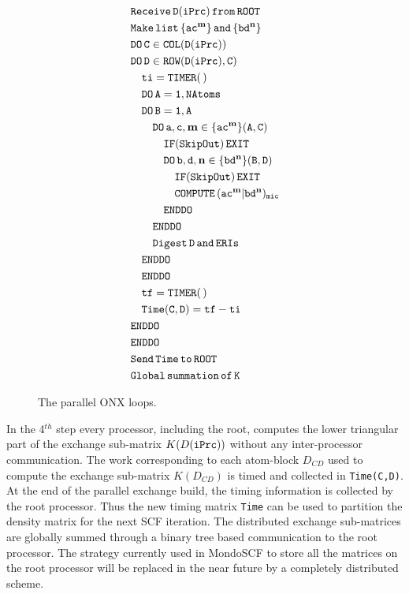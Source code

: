 \documentclass[prl,twocolumn,twocolumngrid,superbib]{revtex4}
\begin{document}
\begin{figure}[htbp]
  \centering
  \caption{\protect
    The parallel ONX loops. 
  }\label{Fig:ONXcore}
  \begin{equation*}
    \begin{split}
      &\tt        Receive\,D(iPrc)\,from\,ROOT\\
      &\tt        Make\,list\,\{ac^\mathbf{m}\}\,and\,\{bd^\mathbf{n}\} \\
      &\tt        DO\,C\in COL(D(iPrc)) \\
      &\tt        DO\,D\in ROW(D(iPrc),C) \\
      &\tt\quad     ti=TIMER(\,) \\
      &\tt\quad     DO\,A=1,NAtoms \\
      &\tt\quad     DO\,B=1,A \\
      &\tt\qquad      DO\,a,c,\mathbf{m}\in\{ac^\mathbf{m}\}(A,C) \\
      &\tt\qquad\quad   IF(SkipOut)\,EXIT  \\
      &\tt\qquad\quad   DO\,b,d,\mathbf{n}\in\{bd^\mathbf{n}\}(B,D) \\
      &\tt\qquad\qquad    IF(SkipOut)\,EXIT  \\
      &\tt\qquad\qquad    COMPUTE\,(ac^\mathbf{m}|bd^\mathbf{n})_{mic} \\
      &\tt\qquad\quad   ENDDO \\
      &\tt\qquad      ENDDO \\
      &\tt\qquad      Digest\,D\,and\,ERIs \\
      &\tt\quad     ENDDO \\
      &\tt\quad     ENDDO \\
      &\tt\quad     tf=TIMER(\,) \\
      &\tt\quad     Time(C,D)=tf-ti \\
      &\tt        ENDDO \\
      &\tt        ENDDO \\
      &\tt        Send\,Time\,to\,ROOT \\
      &\tt        Global\,summation\,of\,K 
    \end{split}
  \end{equation*}
\end{figure}

 In the 4$^{th}$ step every processor, including the root, computes 
 the lower triangular part of the exchange sub-matrix $K(D({\tt iPrc}))$ 
 without any inter-processor communication. 
 The work corresponding to each atom-block
 $D_{CD}$ used to compute the exchange 
 sub-matrix $K(D_{CD})$ is timed and collected in {\tt Time(C,D)}.
 At the end of the parallel exchange build, 
 the timing information is collected by the root processor.
 Thus the new timing matrix {\tt Time} can be used to partition the density 
 matrix for the next SCF iteration.
 The distributed exchange sub-matrices are globally 
 summed through a binary tree based communication to the root processor.
 The strategy currently used in {\sc MondoSCF} to store all the matrices on 
 the root processor will be replaced in the near future
 by a completely distributed scheme.
 
\end{document}
